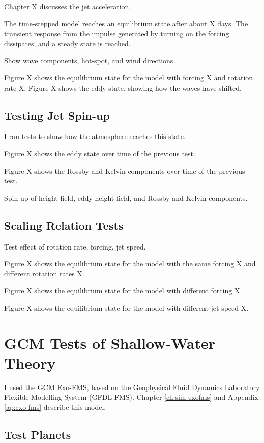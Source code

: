 Chapter X discusses the jet acceleration.

The time-stepped model reaches an equilibrium state after about X days. The transient response from the impulse generated by turning on the forcing dissipates, and a steady state is reached.

Show wave components, hot-spot, and wind directions.

Figure X shows the equilibrium state for the model with forcing X and rotation rate X. Figure X shows the eddy state, showing how the waves have shifted.


\subsection*{Testing Jet Spin-up}

I ran tests to show how the atmosphere reaches this state.

Figure X shows the eddy state over time of the previous test.

Figure X shows the Rossby and Kelvin components over time of the previous test.

Spin-up of height field, eddy height field, and Rossby and Kelvin components.


\subsection*{Scaling Relation Tests}

Test effect of rotation rate, forcing, jet speed.

Figure X shows the equilibrium state for the model with the same forcing X and different rotation rates X.

Figure X shows the equilibrium state for the model with different forcing X.

Figure X shows the equilibrium state for the model with different jet speed X.

\section{GCM Tests of Shallow-Water Theory}

I used the GCM Exo-FMS, based on the Geophysical Fluid Dynamics Laboratory Flexible Modelling System (GFDL-FMS). Chapter \ref{ch:sim-exofms} and Appendix \ref{ap:exo-fms} describe this model.

\subsection*{Test Planets}

